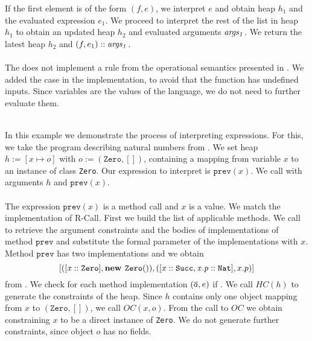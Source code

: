 If the first element is of the form $(f, e)$,
we interpret $e$ and obtain heap $h_1$ and the evaluated expression $e_1$.
We proceed to interpret the rest of the list in heap $h_1$
to obtain an updated heap $h_2$ and evaluated arguments $\mathit{args_1}$.
We return the latest heap $h_2$ and $(f, e_1) :: \mathit{args_1}$.\\
\\
The  does not implement
a rule from the operational semantics presented in .
We added the case in the implementation,
to avoid that the function has undefined inputs.
Since variables are the values of the language,
we do not need to further evaluate them.
%
\begin{example}\quad\\
\label{ex:eval-call}
In this example we demonstrate the process of interpreting expressions.
For this, we take the program describing natural numbers from .
We set heap $h := [x \mapsto o]$ with $o := (\texttt{Zero}, [])$, containing
a mapping from variable $x$ to an instance of class \texttt{Zero}.
Our expression to interpret is $\texttt{prev}(x)$.
We call  with arguments $h$ and $\texttt{prev}(x)$.\\
\\
The expression $\texttt{prev}(x)$ is a method call and
$x$ is a value.
We match the implementation of R-Call.
First we build the list of applicable methods.
We call  to retrieve
the argument constraints and the bodies of
implementations of method $\texttt{prev}$
and substitute the formal parameter
of the implementations with $x$.
Method $\texttt{prev}$ has two implementations
and we obtain
\[ [([\mathit{x} :: \mathit{\texttt{Zero}}], \textbf{new } \mathit{\texttt{Zero}}()),
    ([\mathit{x} :: \mathit{\texttt{Succ}}, \mathit{x.p} :: \mathit{\texttt{Nat}}], x.p)] \]
from .
We check for each method implementation $(\overline{a}, e)$
if .
We call $HC(h)$ to generate the constraints of the heap.
Since $h$ contains only one object mapping from $x$ to $(\texttt{Zero}, [])$,
we call $OC(x, o)$.
From the call to $OC$ we obtain 
constraining $x$ to be a direct instance of \texttt{Zero}.
We do not generate further constraints, since object $o$ has no fields.


\end{example}
